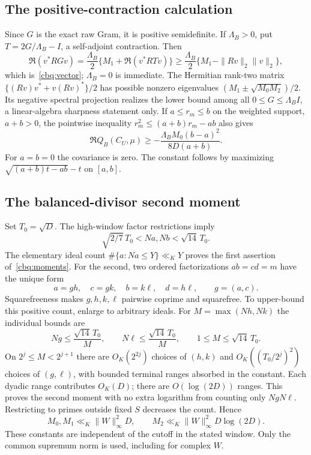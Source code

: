 \documentclass[11pt,oneside,openany]{book}
\theoremstyle{definition}\newtheorem{definition}[theorem]{Definition}
\theoremstyle{remark}\newtheorem{remark}[theorem]{Remark}
\begin{document}
\subsection{The positive-contraction calculation}
Since $G$ is the exact raw Gram, it is positive semidefinite. If
$\Lambda_B>0$, put $T=2G/\Lambda_B-I$, a self-adjoint contraction. Then
\[
 \Re(v^*RGv)=\frac{\Lambda_B}{2}
 \{M_1+\Re(v^*RTv)\}
 \ge\frac{\Lambda_B}{2}\{M_1-\|Rv\|_2\|v\|_2\},
\]
which is~\eqref{cbq:vector}; $\Lambda_B=0$ is immediate.
The Hermitian rank-two matrix
$\{(Rv)v^*+v(Rv)^*\}/2$ has possible nonzero eigenvalues
$(M_1\pm\sqrt{M_0M_2})/2$. Its negative spectral projection realizes
the lower bound among all $0\le G\le\Lambda_B I$, a linear-algebra
sharpness statement only. If $a\le r_m\le b$ on the weighted support,
$a+b>0$, the pointwise inequality $r_m^2\le(a+b)r_m-ab$ also gives
\[
 \Re Q_B(C_U,\mu)\ge
 -\frac{\Lambda_B M_0(b-a)^2}{8D(a+b)}.
\]
For $a=b=0$ the covariance is zero. The constant follows by maximizing
$\sqrt{(a+b)t-ab}-t$ on $[a,b]$.

\subsection{The balanced-divisor second moment}
Set $T_0=\sqrt D$. The high-window factor restrictions imply
\[
 \sqrt{2/7}\,T_0<Na,Nb<\sqrt{14}\,T_0.
\]
The elementary ideal count $\#\{a:Na\le Y\}\ll_K Y$ proves the
first assertion of~\eqref{cbq:moments}. For the second, two ordered
factorizations $ab=cd=m$ have the unique form
\[
 a=gh,\quad c=gk,\quad b=k\ell,\quad d=h\ell,
 \qquad g=(a,c).
\]
Squarefreeness makes $g,h,k,\ell$ pairwise coprime and squarefree.
To upper-bound this positive count, enlarge to arbitrary ideals.
For $M=\max(Nh,Nk)$ the individual bounds are
\[
 Ng\le\frac{\sqrt{14}\,T_0}{M},\qquad
 N\ell\le\frac{\sqrt{14}\,T_0}{M},\qquad
 1\le M\le\sqrt{14}\,T_0.
\]
On $2^j\le M<2^{j+1}$ there are $O_K(2^{2j})$ choices of $(h,k)$
and $O_K((T_0/2^j)^2)$ choices of $(g,\ell)$, with bounded terminal
ranges absorbed in the constant. Each dyadic range contributes $O_K(D)$;
there are $O(\log(2D))$ ranges. This proves the second moment with no
extra logarithm from counting only $NgN\ell$. Restricting to primes
outside fixed $S$ decreases the count. Hence
\[
 M_0,M_1\ll_K\|W\|_\infty^2D,\qquad
 M_2\ll_K\|W\|_\infty^2D\log(2D).
\]
These constants are independent of the cutoff in the stated window.
Only the common supremum norm is used, including for complex $W$.
\end{document}
